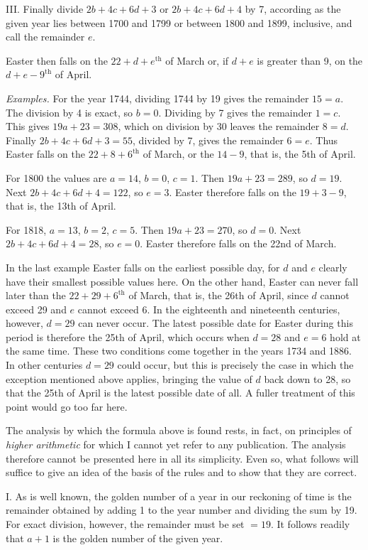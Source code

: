 III. Finally divide $2b+4c+6d+3$ or $2b+4c+6d+4$ by 7, according as the given year lies between 1700 and 1799 or between 1800 and 1899, inclusive, and call the remainder $e$.

Easter then falls on the $22+d+e^{\mathrm{th}}$ of March or, if $d+e$ is greater than 9, on the $d+e-9^{\mathrm{th}}$ of April.

\textit{Examples.} For the year 1744, dividing 1744 by 19 gives the remainder $15=a$. The division by 4 is exact, so $b=0$. Dividing by 7 gives the remainder $1=c$. This gives $19a+23=308$, which on division by 30 leaves the remainder $8=d$. Finally $2b+4c+6d+3=55$, divided by 7, gives the remainder $6=e$. Thus Easter falls on the $22+8+6^{\mathrm{th}}$ of March, or the $14-9$, that is, the 5th of April.

For 1800 the values are $a=14$, $b=0$, $c=1$. Then $19a+23=289$, so $d=19$. Next $2b+4c+6d+4=122$, so $e=3$. Easter therefore falls on the $19+3-9$, that is, the 13th of April.

For 1818, $a=13$, $b=2$, $c=5$. Then $19a+23=270$, so $d=0$. Next $2b+4c+6d+4=28$, so $e=0$. Easter therefore falls on the 22nd of March.

In the last example Easter falls on the earliest possible day, for $d$ and $e$ clearly have their smallest possible values here. On the other hand, Easter can never fall later than the $22+29+6^{\mathrm{th}}$ of March, that is, the 26th of April, since $d$ cannot exceed 29 and $e$ cannot exceed 6. In the eighteenth and nineteenth centuries, however, $d=29$ can never occur. The latest possible date for Easter during this period is therefore the 25th of April, which occurs when $d=28$ and $e=6$ hold at the same time. These two conditions come together in the years 1734 and 1886. In other centuries $d=29$ could occur, but %
%
this is precisely the case in which the exception mentioned above applies, bringing the value of $d$ back down to 28, so that the 25th of April is the latest possible date of all. A fuller treatment of this point would go too far here.

The analysis by which the formula above is found rests, in fact, on principles of \textit{higher arithmetic} for which I cannot yet refer to any publication. The analysis therefore cannot be presented here in all its simplicity. Even so, what follows will suffice to give an idea of the basis of the rules and to show that they are correct.

I. As is well known, the golden number of a year in our reckoning of time is the remainder obtained by adding 1 to the year number and dividing the sum by 19. For exact division, however, the remainder must be set $=19$. It follows readily that $a+1$ is the golden number of the given year.

